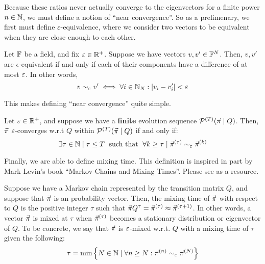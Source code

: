 Because these ratios never actually converge to the eigenvectors for a finite power $n \in \mathbb{N}$, we must define a notion of ``near convergence''.
So as a prelimenary, we first must define $\varepsilon$-equivalence, where we consider two vectors to be equivalent when they are close enough to each other.

\begin{definition}
Let $\mathbb{F}$ be a field, and fix $\varepsilon \in \mathbb{R}^+$. Suppose we have vectors $v, v' \in \mathbb{F}^N$.
Then, $v, v'$ are $\epsilon$-equivalent if and only if each of their components have a difference of at most $\varepsilon$.
In other words,
$$v \sim_\varepsilon v' \iff \forall i \in \mathbb{N}_N: |v_i - v'_i| < \varepsilon$$
\end{definition}




This makes defining ``near convergence'' quite simple.

\begin{definition}
Let $\varepsilon \in \mathbb{R}^+$, and suppose we have a \textbf{finite} evolution sequence $\mathcal{P}^{(T)}(\vec{\pi} \mid Q)$.
Then, $\vec{\pi}$ $\varepsilon$-converges w.r.t $Q$ within $\mathcal{P}^{(T)}(\vec{\pi} \mid Q)$ if and only if:
$$ \exists \tau \in \mathbb{N} \mid \tau \leq T \text{\; such that \;} \forall k \geq \tau \mid \vec{\pi}^{(\tau)} \sim_\varepsilon \vec{\pi}^{(k)}$$
\end{definition}

Finally, we are able to define mixing time.
This definition is inspired in part by Mark Levin's book ``Markov Chains and Mixing Times''.
Please see \cite{levin} as a resource.

\begin{definition}
Suppose we have a Markov chain represented by the transition matrix $Q$, and suppose that $\vec{\pi}$ is an probability vector.
Then, the mixing time of $\vec{\pi}$ with respect to $Q$ is the positive integer $\tau$ such that $\vec{\pi} Q^\tau = \vec{\pi}^{(\tau)} \approx \vec{\pi}^{(\tau + 1)}$.
In other words, a vector $\vec{\pi}$ is mixed at $\tau$ when $\vec{\pi}^{(\tau)}$ becomes a stationary distribution or eigenvector of $Q$.
To be concrete, we say that $\vec{\pi}$ is $\varepsilon$-mixed w.r.t. $Q$ with a mixing time of $\tau$ given the following:
$$\tau = \min\left\{ N \in \mathbb{N} \mid \forall n \geq N : \vec{\pi}^{(n)} \sim_{\varepsilon} \vec{\pi}^{(N)} \right\} $$
\end{definition}


